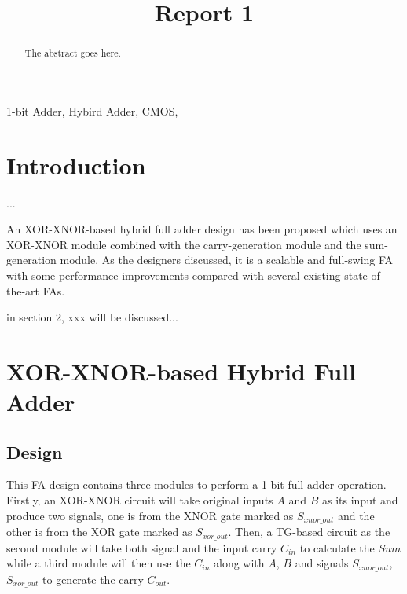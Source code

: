\documentclass[conference]{IEEEtran}
\begin{document}
\title{Report 1}

\author{
}
\maketitle

\begin{abstract}
	The abstract goes here.
\end{abstract}

\begin{IEEEkeywords}
	1-bit Adder, Hybird Adder, CMOS,
\end{IEEEkeywords}

\section{Introduction}

...

An XOR-XNOR-based hybrid full adder design has been proposed\cite{20212210429416}
which uses an XOR-XNOR module combined with the carry-generation module and the sum-generation module.
As the designers discussed, it is a scalable and full-swing FA
with some performance improvements compared with several existing state-of-the-art FAs.

in section 2, xxx will be discussed...


\section{XOR-XNOR-based Hybrid Full Adder}

\subsection{Design}

This FA\cite{20212210429416} design contains three modules to perform a 1-bit full adder operation.
Firstly, an XOR-XNOR circuit will take original inputs \(A\) and \(B\) as its input and produce two signals,
one is from the XNOR gate marked as \(S_{xnor\_out}\) and the other is from the XOR gate marked as \( S_{xor\_out}\).
Then, a TG-based circuit as the second module will take both signal and the input carry \(C_{in}\) to calculate the \(Sum\)
while a third module will then use the \(C_{in}\) along with \(A\), \(B\) and signals \(S_{xnor\_out}\), \( S_{xor\_out}\) to generate the carry \(C_{out}\).
\end{document}
